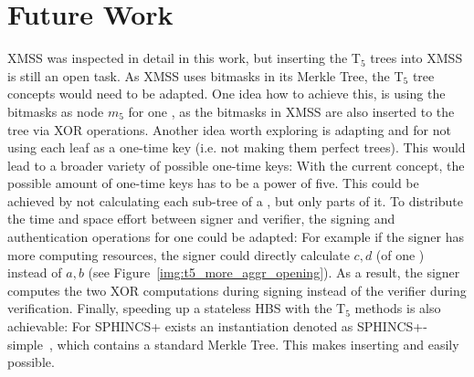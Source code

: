 \section{Future Work}
XMSS was inspected in detail in this work, but inserting the T$_5$ trees into XMSS is still an open task. As XMSS uses bitmasks in its Merkle Tree, the T$_5$ tree concepts would need to be adapted. One idea how to achieve this, is using the bitmasks as node $m_5$ for one \tftree, as the bitmasks in XMSS are also inserted to the tree via XOR operations.
Another idea worth exploring is adapting \tftree and \extree for not using each leaf as a one-time key (i.e. not making them perfect trees). This would lead to a broader variety of possible one-time keys: With the current concept, the possible amount of one-time keys has to be a power of five. This could be achieved by not calculating each sub-tree of a \tftree, but only parts of it.
To distribute the time and space effort between signer and verifier, the signing and authentication operations for one \tfblock could be adapted: 
For example if the signer has more computing resources, the signer could directly calculate $c,d$ (of one \tfblock) instead of $a,b$ (see Figure~\ref{img:t5_more_aggr_opening}). As a result, the signer computes the two XOR computations during signing instead of the verifier during verification.
Finally, speeding up a stateless HBS with the T$_5$ methods is also achievable: For SPHINCS+ exists an instantiation denoted as SPHINCS+-simple~\cite{sphincs+_submussion_nist_round3}, which contains a standard Merkle Tree. This makes inserting \tftree and \extree easily possible.
